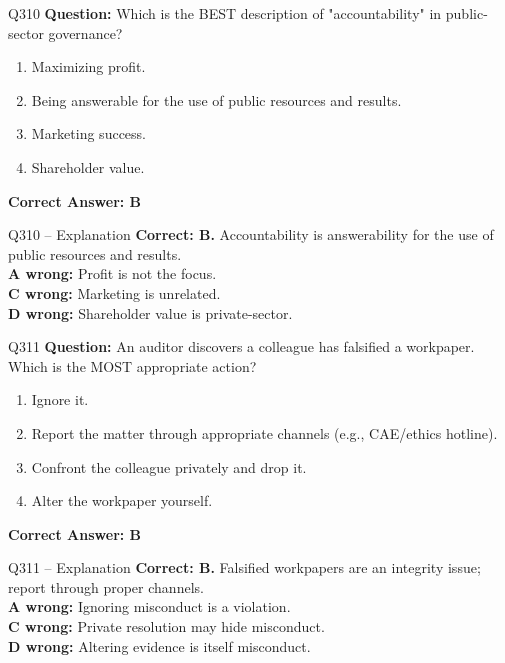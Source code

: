 \documentclass[aspectratio=169,10pt]{beamer}
\begin{document}
	\begin{frame}[t]{Q310}
		\small
		\textbf{Question:} Which is the BEST description of "accountability" in public-sector governance?
		\begin{enumerate}[label=\Alph*.,itemsep=1pt,topsep=2pt]
			\item Maximizing profit.
			\item Being answerable for the use of public resources and results.
			\item Marketing success.
			\item Shareholder value.
		\end{enumerate}
		\vspace{4pt}
		\textbf{Correct Answer: B}
	\end{frame}
	
	\begin{frame}[t]{Q310 -- Explanation}
		\small
		\textbf{Correct: B.} Accountability is answerability for the use of public resources and results. \\[4pt]
		\textbf{A wrong:} Profit is not the focus. \\[2pt]
		\textbf{C wrong:} Marketing is unrelated. \\[2pt]
		\textbf{D wrong:} Shareholder value is private-sector.
	\end{frame}
	
	\begin{frame}[t]{Q311}
		\small
		\textbf{Question:} An auditor discovers a colleague has falsified a workpaper. Which is the MOST appropriate action?
		\begin{enumerate}[label=\Alph*.,itemsep=1pt,topsep=2pt]
			\item Ignore it.
			\item Report the matter through appropriate channels (e.g., CAE/ethics hotline).
			\item Confront the colleague privately and drop it.
			\item Alter the workpaper yourself.
		\end{enumerate}
		\vspace{4pt}
		\textbf{Correct Answer: B}
	\end{frame}
	
	\begin{frame}[t]{Q311 -- Explanation}
		\small
		\textbf{Correct: B.} Falsified workpapers are an integrity issue; report through proper channels. \\[4pt]
		\textbf{A wrong:} Ignoring misconduct is a violation. \\[2pt]
		\textbf{C wrong:} Private resolution may hide misconduct. \\[2pt]
		\textbf{D wrong:} Altering evidence is itself misconduct.
	\end{frame}
	
\end{document}
